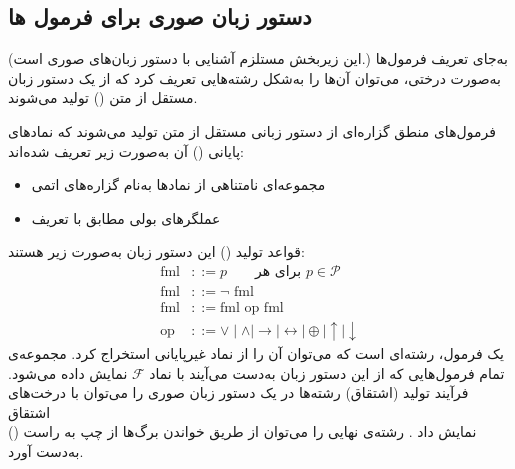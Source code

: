\subsection*{ \quad دستور زبان صوری برای فرمول ها}
  (این زیر‌بخش مستلزم آشنایی با دستور زبان‌های صوری است.)
  به‌جای تعریف فرمول‌ها به‌صورت درختی، می‌توان آن‌ها را به‌شکل رشته‌هایی تعریف کرد که از یک دستور زبان مستقل از متن () تولید می‌شوند.
  \begin{definition}[تعریف \lr{2.13}]
    فرمول‌های منطق گزاره‌ای از دستور زبانی مستقل از متن تولید می‌شوند که نمادهای پایانی () آن به‌صورت زیر تعریف شده‌اند:
    \begin{itemize}
      \item مجموعه‌ای نامتناهی از نمادها به‌نام گزاره‌های اتمی 
      \item عملگرهای بولی مطابق با تعریف 
    \end{itemize}
    قواعد تولید () این دستور زبان به‌صورت زیر هستند:
    \begin{align*}
      \text{fml} &::= p \qquad \text{برای هر } p \in \mathcal{P} \\
      \text{fml} &::= \neg \text{ fml} \\
      \text{fml} &::= \text{fml op fml} \\
      \text{op} &::= \lor \mid \land \mid \rightarrow \mid \leftrightarrow \mid \oplus \mid \uparrow \mid \downarrow
    \end{align*}
    یک فرمول، رشته‌ای است که می‌توان آن را از نماد غیرپایانی  استخراج کرد. مجموعه‌ی تمام فرمول‌هایی که از این دستور زبان به‌دست می‌آیند با نماد $\mathscr{F}$ نمایش داده می‌شود.
    فرآیند تولید (اشتقاق) رشته‌ها در یک دستور زبان صوری را می‌توان با درخت‌های اشتقاق \\ () نمایش داد . رشته‌ی نهایی را می‌توان از طریق خواندن برگ‌ها از چپ به راست به‌دست آورد.
  \end{definition}
